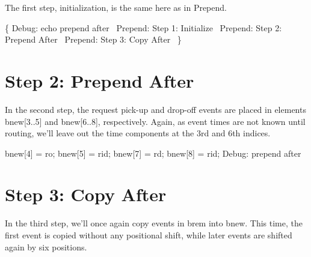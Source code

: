 The first step, initialization, is the same here as in Prepend.

\nwenddocs{}\endmoddef\nwstartdeflinemarkup{}\nwenddeflinemarkup
\{
  \LA{}Debug: echo prepend after~{\nwtagstyle{}}\RA{}
  \LA{}Prepend: Step 1: Initialize~{\nwtagstyle{}}\RA{}
  \LA{}Prepend: Step 2: Prepend After~{\nwtagstyle{}}\RA{}
  \LA{}Prepend: Step 3: Copy After~{\nwtagstyle{}}\RA{}
\}
\nwendcode{}\nwdocspar

\section{Step 2: Prepend After}

In the second step, the request pick-up and drop-off events are placed in
elements {\Tt{}bnew[3..5]\nwendquote} and {\Tt{}bnew[6..8]\nwendquote}, respectively. Again, as event
times are not known until routing, we'll leave out the time components
at the 3rd and 6th indices.

\nwenddocs{}\endmoddef\nwstartdeflinemarkup{}\nwenddeflinemarkup
bnew[4] = ro;
bnew[5] = rid;
bnew[7] = rd;
bnew[8] = rid;
\LA{}Debug: prepend after~{\nwtagstyle{}}\RA{}
\nwendcode{}\nwdocspar

\section{Step 3: Copy After}

In the third step, we'll once again copy events in {\Tt{}brem\nwendquote} into {\Tt{}bnew\nwendquote}.
This time, the first event is copied without any positional shift, while later
events are shifted again by six positions.

